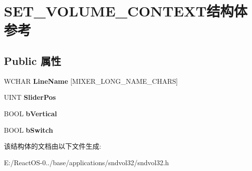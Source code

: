 \hypertarget{struct_s_e_t___v_o_l_u_m_e___c_o_n_t_e_x_t}{}\section{S\+E\+T\+\_\+\+V\+O\+L\+U\+M\+E\+\_\+\+C\+O\+N\+T\+E\+X\+T结构体 参考}
\label{struct_s_e_t___v_o_l_u_m_e___c_o_n_t_e_x_t}
\subsection*{Public 属性}
\begin{DoxyCompactItemize}
\item 
\mbox{\label{struct_s_e_t___v_o_l_u_m_e___c_o_n_t_e_x_t_a31a254b1affe2a91186c4df12789c00d}} 
W\+C\+H\+AR {\bfseries Line\+Name} \mbox{[}M\+I\+X\+E\+R\+\_\+\+L\+O\+N\+G\+\_\+\+N\+A\+M\+E\+\_\+\+C\+H\+A\+RS\mbox{]}
\item 
\mbox{\label{struct_s_e_t___v_o_l_u_m_e___c_o_n_t_e_x_t_a6c8f6a1fdb240f1302bb585ab963037f}} 
U\+I\+NT {\bfseries Slider\+Pos}
\item 
\mbox{\label{struct_s_e_t___v_o_l_u_m_e___c_o_n_t_e_x_t_a27ffc9f8c203ac056c4591297ebf08fd}} 
B\+O\+OL {\bfseries b\+Vertical}
\item 
\mbox{\label{struct_s_e_t___v_o_l_u_m_e___c_o_n_t_e_x_t_a76e0be20e2016c127f7a6592fa2a533d}} 
B\+O\+OL {\bfseries b\+Switch}
\end{DoxyCompactItemize}


该结构体的文档由以下文件生成\+:\begin{DoxyCompactItemize}
\item 
E\+:/\+React\+O\+S-\/0../base/applications/sndvol32/sndvol32.\+h\end{DoxyCompactItemize}
